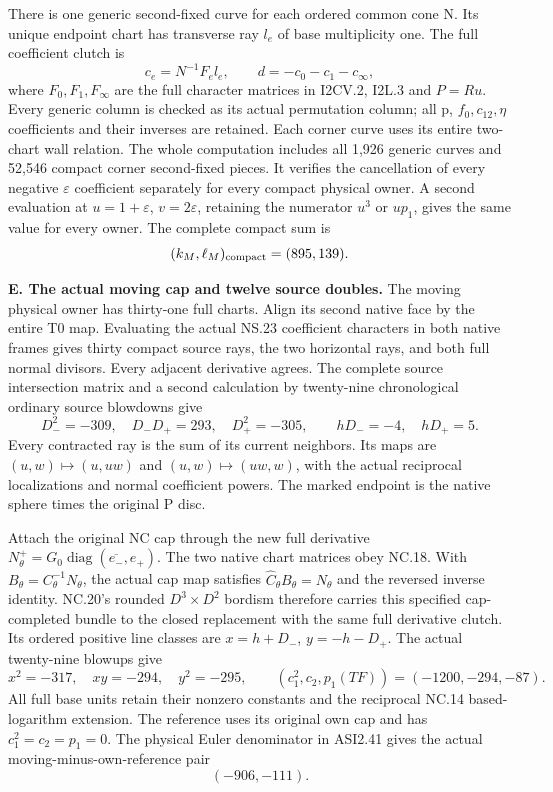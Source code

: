 There is one generic second-fixed curve for each ordered common cone N.
Its unique endpoint chart has transverse ray \(l_e\) of base multiplicity
one.  The full coefficient clutch is
\[
c_e=N^{-1}F_el_e,\qquad d=-c_0-c_1-c_\infty,
\]
where \(F_0,F_1,F_\infty\) are the full character matrices in I2CV.2,
I2L.3 and \(P=Ru\).  Every generic column is checked as its actual
permutation column; all p, \(f_0,c_{12},\eta\) coefficients and their
inverses are retained.  Each corner curve uses its entire two-chart wall
relation.  The whole computation includes all 1,926 generic curves and
52,546 compact corner second-fixed pieces.  It verifies the cancellation
of every negative \(\varepsilon\) coefficient separately for every
compact physical owner.  A second evaluation at \(u=1+\varepsilon\),
\(v=2\varepsilon\), retaining the numerator \(u^3\) or \(up_1\),
gives the same value for every owner.  The complete compact sum is
\[
                         (k_M,\ell_M)_{\rm compact}=(895,139).
\]

\medskip\noindent\textbf{E. The actual moving cap and twelve source doubles.}
The moving physical owner has thirty-one full charts.  Align its second
native face by the entire T0 map.  Evaluating the actual NS.23 coefficient
characters in both native frames gives thirty compact source rays, the
two horizontal rays, and both full normal divisors.  Every adjacent
derivative agrees.  The complete source intersection matrix and a second
calculation by twenty-nine chronological ordinary source blowdowns give
\[
D_-^2=-309,\quad D_-D_+=293,\quad D_+^2=-305,
\qquad hD_-=-4,\quad hD_+=5.
\]
Every contracted ray is the sum of its current neighbors.  Its maps are
\((u,w)\mapsto(u,uw)\) and \((u,w)\mapsto(uw,w)\), with the actual
reciprocal localizations and normal coefficient powers.  The marked
endpoint is the native sphere times the original P disc.

Attach the original NC cap through the new full derivative
\(N^+_\theta=G_0\operatorname{diag}(\overline{e_-},e_+)\).
The two native chart matrices obey NC.18.  With
\(B_\theta=C_\theta^{-1}N_\theta\), the actual cap map satisfies
\(\widehat C_\theta B_\theta=N_\theta\) and the reversed inverse
identity.  NC.20's rounded \(D^3\times D^2\) bordism therefore carries
this specified cap-completed bundle to the closed replacement with the
same full derivative clutch.  Its ordered positive line classes are
\(x=h+D_-\), \(y=-h-D_+\).  The actual twenty-nine blowups give
\[
x^2=-317,\quad xy=-294,\quad y^2=-295,
\qquad(c_1^2,c_2,p_1(TF))=(-1200,-294,-87).
\]
All full base units retain their nonzero constants and the reciprocal
NC.14 based-logarithm extension.  The reference uses its original own
cap and has \(c_1^2=c_2=p_1=0\).  The physical Euler denominator in
ASI2.41 gives the actual moving-minus-own-reference pair
\[
                              (-906,-111).
\]


